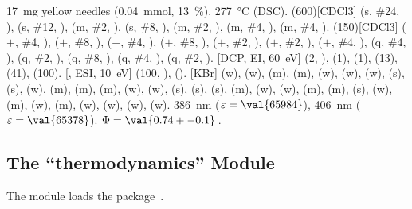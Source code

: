 \documentclass{chemmacros-manual}
\def\chemmodule*#1{\textquotedblleft#1\textquotedblright}%
\begin{document}
\begin{experimental}[
    format=\color{red}\itshape,
    list=true,
    delta=\textcolor{green}{\ch{M+ + H2O}},
    pos-number=side,
    coupling-unit=\mega\gram\per\square\second,
    list-setup=,use-equal]
   \SI{17}{\milli\gram} yellow needles (\SI{0.04}{\milli\mole},
  \SI{13}{\percent}).
   \SI{277}{\celsius} (DSC).
  \NMR(600)[CDCl3]  (s, \#{24}, ),  (s, \#{12},
  ),  (m, \#{2}, ),  (s, \#{8},
  ),  (m, \#{2}, ),  (m, \#{4},
  ),  (m, \#{4}, ).
  (150)[CDCl3]  ($+$, \#{4}, ),  ($+$,
  \#{8}, ),  ($+$, \#{4}, ),  ($+$, \#{8},
  ),  ($+$, \#{2}, ),  ($+$, \#{2},
  ),  ($+$, \#{4}, ),  (q, \#{4},
  ),  (q, \#{2}, ),  (q, \#{8}, ),
   (q, \#{4}, ),  (q, \#{2}, ).
  [DCP, EI, \SI{60}{\electronvolt}]  (2, ), 
  (1),  (1),  (13),  (41),  (100).
  [, ESI, \SI{10}{\electronvolt}]  (100,
  ),  ().
  [KBr]  (w),  (w),  (m), 
  (m),  (w),  (w),  (w),  (s),
   (s),  (w),  (m),  (m), 
  (m),  (w),  (w),  (s),  (s),
   (s),  (m),  (w),  (w), 
  (m),  (m),  (s),  (w),  (m), 
  (w),  (m),  (w),  (w),  (w), 
  (w).
   \SI{386}{\nano\metre} ($\varepsilon = \val{65984}$),
  \SI{406}{\nano\metre} ($\varepsilon = \val{65378}$).
   $\Phi = \val{0.74+-0.1}$\,.
\end{experimental}

\subsection{The \chemmodule*{thermodynamics} Module}\label{sec:thermodynamics-module}

The  module loads the 
package~\cite{pkg:siunitx}.
\end{document}
